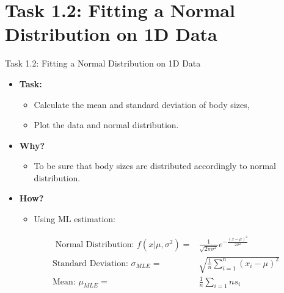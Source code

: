 \documentclass{beamer}
\begin{document}
\section{Task 1.2: Fitting a Normal Distribution on 1D Data}

\begin{frame}{Task 1.2: Fitting a Normal Distribution on 1D Data}
\begin{itemize}
	\item \textbf{Task:} 
	\begin{itemize}
		\item Calculate the mean and standard deviation of body sizes,
		\item Plot the data and normal distribution.
	\end{itemize}
	\item \textbf{Why?}
	\begin{itemize}
		\item To be sure that body sizes are distributed accordingly to normal distribution.
	\end{itemize}
	\item \textbf{How?} 
	\begin{itemize}
		\item Using ML estimation:
	\end{itemize}
		\begin{align*}
	\text{ Normal Distribution: } f(x|\mu,\sigma^2) =& \frac{1}{\sqrt{2\pi\sigma^2}}e^{-\frac{(x-\mu)^2}{2\sigma^2}} \\
	\text{Standard Deviation: } \sigma_{MLE} =& \sqrt{\frac{1}{n}\sum_{i=1}^{n}(x_i-\mu)^2} \\
	\text{Mean: } \mu_{MLE} =& \frac{1}{n}\sum_{i=1}{n}{s_i}
\end{align*}
\end{itemize}
\end{frame}
\end{document}
